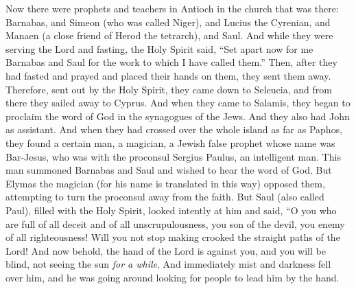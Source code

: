 \begin{biblechapter} %
 Now there were prophets and teachers in Antioch in the church that was there: Barnabas, and Simeon (who was called Niger), and Lucius the Cyrenian, and Manaen (a close friend of Herod the tetrarch), and Saul.
\verse And while they were serving the Lord and fasting, the Holy Spirit said, “Set apart now for me Barnabas and Saul for the work to which I have called them.”
\verse Then, after they had fasted and prayed and placed their hands on them, they sent them away.
 Therefore, sent out by the Holy Spirit, they came down to Seleucia, and from there they sailed away to Cyprus.
\verse And when they came to Salamis, they began to proclaim the word of God in the synagogues of the Jews. And they also had John as assistant.
\verse And when they had crossed over the whole island as far as Paphos, they found a certain man, a magician, a Jewish false prophet whose name was Bar-Jesus,
\verse who was with the proconsul Sergius Paulus, an intelligent man. This man summoned Barnabas and Saul and wished to hear the word of God.
\verse But Elymas the magician (for his name is translated in this way) opposed them, attempting to turn the proconsul away from the faith.
\verse But Saul (also called Paul), filled with the Holy Spirit, looked intently at him
\verse and said, “O you who are full of all deceit and of all unscrupulousness, you son of the devil, you enemy of all righteousness! Will you not stop making crooked the straight paths of the Lord!
\verse And now behold, the hand of the Lord is against you, and you will be blind, not seeing the sun \textit{for a while}. And immediately mist and darkness fell over him, and he was going around looking for people to lead him by the hand.

\end{biblechapter}
